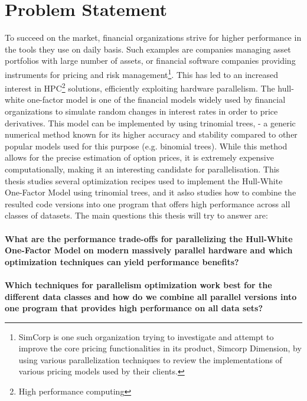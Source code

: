 
\section{Problem Statement}
\label{section:problemstatement}
To succeed on the market, financial organizations strive for higher performance in the tools they use on daily basis. Such examples are companies managing asset portfolios with large number of assets, or financial software companies providing instruments for pricing and risk management\footnote{SimCorp is one such organization trying to investigate and attempt to improve the core pricing functionalities in its product, Simcorp Dimension, by using various parallelization techniques to review the implementations of various pricing models used by their clients.}. This has led to an increased interest in HPC\footnote{High performance computing} solutions, efficiently exploiting hardware parallelism. The hull-white one-factor model is one of the financial models widely used by financial organizations to simulate random changes in interest rates in order to price derivatives. This model can be implemented by using trinomial trees\cite[pg. 444]{ofod}, \cite{uhwirt} - a generic numerical method known for its higher accuracy and stability compared to other popular models used for this purpose (e.g. binomial trees). While this method allows for the precise estimation of option prices, it is extremely expensive computationally, making it an interesting candidate for parallelisation. This thesis studies several optimization recipes used to implement the Hull-White One-Factor Model using trinomial trees, and it aslso studies how to combine the resulted code versions into one program that offers high performance across all classes of datasets. The main questions this thesis will try to answer are:\\\\
\textbf{What are the performance trade-offs for parallelizing the Hull-White One-Factor Model on modern massively parallel hardware and which optimization techniques can yield performance benefits?}\\\\
\textbf{Which techniques for parallelism optimization work best for the different data classes and how do we combine all parallel versions into one program that provides high performance on all data sets?}

